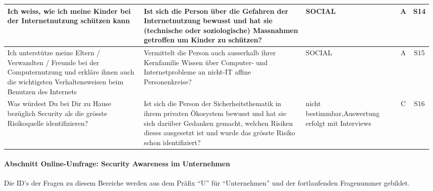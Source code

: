 \documentclass[../../main.tex]{subfiles}
\begin{document}
\begin{table}[H]
\begin{tabular}{ |p{5.5cm}|p{5.5cm}|p{2.5cm}|c|c|}
Ich weiss, wie ich meine Kinder bei der Internetnutzung schützen kann &  Ist sich die Person über die Gefahren der Internetnutzung bewusst und hat sie (technische oder soziologische) Massnahmen getroffen um Kinder zu schützen? & SOCIAL & A & S14 \\
\hline

Ich unterstütze meine Eltern / Verwandten / Freunde bei der Computernutzung und erkläre ihnen auch die wichtigsten Verhaltensweisen beim Benutzen des Internets &  Vermittelt die Person auch ausserhalb ihrer Kernfamilie Wissen über Computer- und Internetprobleme an nicht-IT affine Personenkreise? & SOCIAL & A & S15 \\
\hline

Was würdest Du bei Dir zu Hause bezüglich Security als die grösste Risikoquelle identifizieren? &  Ist sich die Person der Sicherheitsthematik in ihrem privaten Ökosystem bewusst und hat sie sich darüber Gedanken gemacht, welchen Risiken dieses ausgesetzt ist und wurde das grösste Risiko schon identifiziert? & nicht bestimmbar,\newline Auswertung erfolgt mit Interviews & C & S16 \\
\hline

\end{tabular}
\end{table}



\paragraph*{Abschnitt Online-Umfrage: Security Awareness im Unternehmen}\mbox{}

\begin{sloppypar}
Die ID's der Fragen zu diesem Bereiche werden aus dem Präfix "`U"' für "`Unternehmen"' und der fortlaufenden Fragenummer gebildet.
\end{sloppypar}


\sloppy 
\end{document}

